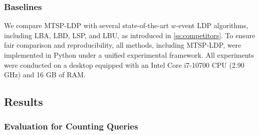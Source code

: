 \documentclass[acmsmall]{acmart}
\newcommand{\E}{\mathbb{E}}
\begin{document}


\subsubsection{Baselines}

We compare MTSP-LDP with several state-of-the-art $w$-event LDP algorithms,
including LBA, LBD, LSP, and LBU, as introduced in \cref{ss:competitors}.
To ensure fair comparison and reproducibility, all methods, including MTSP-LDP,
were implemented in Python under a unified experimental framework.
All experiments were conducted on a desktop equipped with an Intel Core i7-10700
CPU (2.90 GHz) and 16 GB of RAM.





\subsection{Results}

\subsubsection{Evaluation for Counting Queries}
\end{document}
